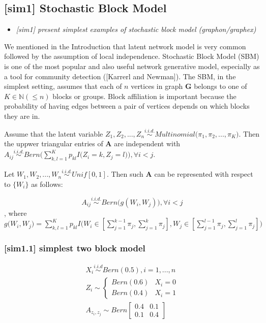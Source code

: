 \documentclass[12pt]{article}
\theoremstyle{definition}
\begin{document}
\subsection{[sim1] Stochastic Block Model}
\begin{itemize}
	\item {\it  [sim1] present simplest examples of stochastic block model (graphon/graphex) \/}
\end{itemize}

 We mentioned in the Introduction that latent network model is very common followed by the assumption of local independence. Stochastic Block Model (SBM) is one of the most popular and also useful network generative model, especially as a tool for community detection ([Karrerl and Newman]). The SBM, in the simplest setting, assumes that each of $n$ vertices in graph $\boldsymbol{G}$ belongs to one of $K \in \mathbb{N} (\leq n)$ blocks or groups. Block affiliation is important because the probability of having edges between a pair of vertices depends on which blocks they are in. 
 
 Assume that the latent variable $Z_{1}, Z_{2}, ... , Z_{n} \overset{i.i.d.}{\sim} Multinomial\big( \pi_{1}, \pi_{2}, ... , \pi_{K} \big)$. Then the uppwer triangular entries of $\mathbf{A}$ are independent with 
 $A_{ij} \overset{i.i.d.}{\sim} Bern\big( \sum\limits_{k,l=1}^{K} p_{kl} I\big( Z_{i} = k, Z_{j} = l  \big)    \big), \forall  i < j$.
 
 Let $W_{1}, W_{2}, ... , W_{n} \overset{i.i.d.}{\sim} Unif[0,1]$. Then such $\mathbf{A}$ can be represented with respect to $\{ W_{i} \}$ as follows:

\begin{equation} 
A_{ij} \overset{i.i.d.}{\sim} Bern \big( g(W_{i}, W_{j})  \big), \forall i < j
\end{equation}
 , where $g\big( W_{i}, W_{j} \big) = \sum\limits_{k,l=1}^{K} p_{kl} I \big( W_{i} \in [\sum\limits_{j=1}^{k-1} \pi_{j}, \sum\limits_{j=1}^{k} \pi_{j}   ] , W_{j} \in [\sum\limits_{j=1}^{l-1} \pi_{j}, \sum\limits_{j=1}^{l} \pi_{j}  ]  \big)$


\subsubsection{[sim1.1] simplest two block model}

\begin{equation}
\begin{gathered}
X_{i} \overset{i.i.d}{\sim} Bern(0.5), i = 1,... , n \\ 
Z_{i}  \sim  \left\{  \begin{array}{cc} Bern(0.6) & X_{i} = 0 \\ Bern(0.4) & X_{i} = 1  \end{array} \right. \\
A_{z_{i}, z_{j}} \sim Bern \left[  \begin{array}{cc}   0.4 & 0.1  \\ 0.1 & 0.4 \end{array}  \right]
\end{gathered}
\end{equation}
\end{document}
